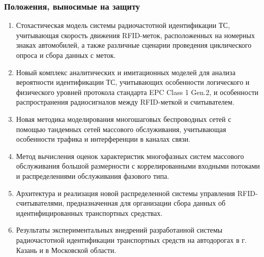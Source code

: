 \begin{frame}[allowframebreaks]
    \frametitle{Положения, выносимые на защиту}
    \begin{enumerate}
        \item Стохастическая модель системы радиочастотной идентификации ТС, учитывающая скорость движения RFID-меток, расположенных на номерных знаках автомобилей, а также различные сценарии проведения циклического опроса и сбора данных с меток.
        \item Новый комплекс аналитических и имитационных моделей для анализа вероятности идентификации ТС, учитывающих особенности логического и физического уровней протокола стандарта EPC Class 1 Gen.2, и особенности распространения радиосигналов между RFID-меткой и считывателем.
        \item Новая методика моделирования многошаговых беспроводных сетей с помощью тандемных сетей массового обслуживания, учитывающая особенности трафика и интерференции в каналах связи.
        \framebreak
        \item Метод вычисления оценок характеристик многофазных систем массового обслуживания большой размерности с коррелированными входными потоками и распределениями обслуживания фазового типа.
        \item Архитектура и реализация новой распределенной системы управления RFID-считывателями, предназначенная для организации сбора данных об идентифицированных транспортных средствах.
        \item Результаты экспериментальных внедрений разработанной системы радиочастотной идентификации транспортных средств на автодорогах в г. Казань и в Московской области.
    \end{enumerate}
\end{frame}

